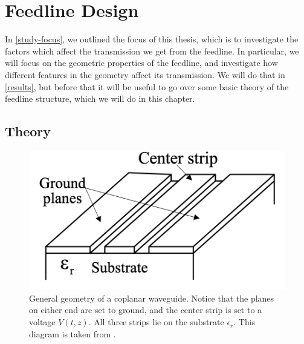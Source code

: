 \chapter{Feedline Design}
In \cref{study-focus}, we outlined the focus of this thesis, which is to investigate the factors which affect
the transmission we get from the feedline. In particular, we will focus on the geometric properties of the
feedline, and investigate how different features in the geometry affect its transmission. We will do that in
\cref{results}, but before that it will be useful to go over some basic theory of the feedline structure,
which we will do in this chapter. 

\section{Theory}
\label{cpw-theory}
\begin{figure}
	\centering
	\includegraphics[scale=0.5]{images/cpw-diagram.png}
	\caption{General geometry of a coplanar waveguide. Notice that the planes on either end are set to
		ground, and the center strip is set to a voltage \( V(t, z) \). All three strips lie on the substrate \(
	\epsilon_r \). This diagram is taken from \cite{gaoPhysicsSuperconductingMicrowave}.}  
	\label{cpw-diagram}
\end{figure}

